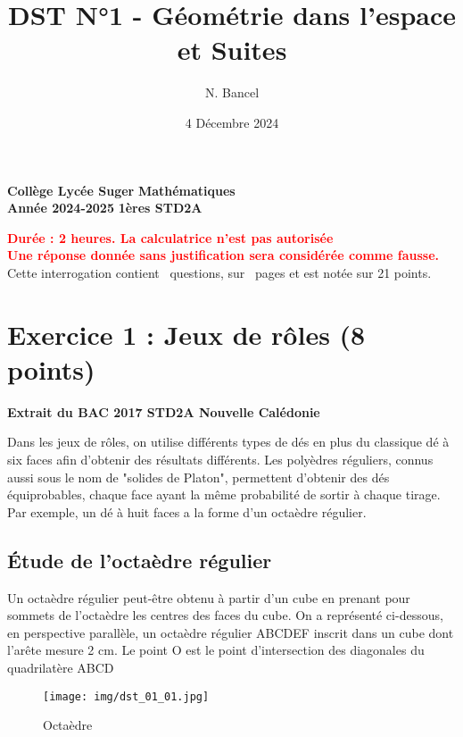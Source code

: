 \documentclass{exam}
\title{DST N°1 - Géométrie dans l'espace et Suites}
\author{N. Bancel}
\date{4 Décembre 2024}
\begin{document}
\textbf{Collège Lycée Suger}
\hfill
\textbf{Mathématiques} \\

\textbf{Année 2024-2025}
\hfill
\textbf{1ères STD2A} \par

{\let\newpage\relax\maketitle}

\begin{center}
\textbf{\textcolor{red}{Durée : 2 heures. La calculatrice n'est pas autorisée}} \\
\textbf{\textcolor{red}{Une réponse donnée sans justification sera considérée comme fausse.}} \\
Cette interrogation contient \numquestions\ questions, sur \numpages\ pages et est notée sur 21 points. 

\end{center}

\section*{Exercice 1 : Jeux de rôles (8 points)}

\textbf{Extrait du BAC 2017 STD2A Nouvelle Calédonie} \par
\vspace{1em}
Dans les jeux de rôles, on utilise différents types de dés en plus du classique dé à six faces afin
d'obtenir des résultats différents. Les polyèdres réguliers, connus aussi sous le nom de "solides de
Platon", permettent d'obtenir des dés équiprobables, chaque face ayant la même probabilité de
sortir à chaque tirage. Par exemple, un dé à huit faces a la forme d'un octaèdre régulier.

\subsection*{Étude de l'octaèdre régulier}

Un octaèdre régulier peut-être obtenu à partir d'un cube en prenant pour sommets de l'octaèdre les centres des faces du cube.
On a représenté ci-dessous, en perspective parallèle, un octaèdre régulier ABCDEF inscrit dans un cube dont l'arête mesure 2 cm.
Le point O est le point d'intersection des diagonales du quadrilatère ABCD

\begin{figure}[H]
  \centering
  \texttt{[image: img/dst\_01\_01.jpg]}
  \caption{\label{} Octaèdre}
\end{figure}
\end{document}
